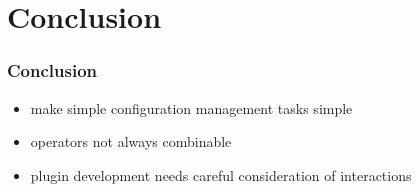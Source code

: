 \section{Conclusion}

\begin{frame}
	\frametitle{Conclusion}
	\begin{itemize}
	\item make simple configuration management tasks simple
	\item operators not always combinable
	\item plugin development needs careful consideration of interactions
	\end{itemize}
\end{frame}



\nocite{raab2017introducing}

\appendix

\begin{frame}[allowframebreaks]
	
	
\end{frame}




